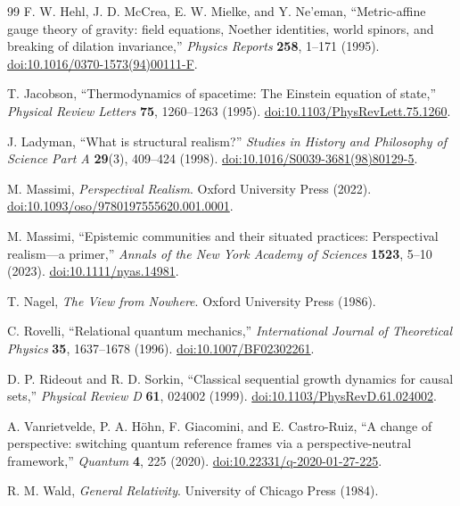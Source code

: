 \documentclass[11pt]{article}
\theoremstyle{definition}
\theoremstyle{remark}
\begin{document}
\begin{thebibliography}{99}
F. W. Hehl, J. D. McCrea, E. W. Mielke, and Y. Ne'eman, ``Metric-affine gauge theory of gravity: field equations, Noether identities, world spinors, and breaking of dilation invariance,'' \emph{Physics Reports} \textbf{258}, 1--171 (1995). \href{https://doi.org/10.1016/0370-1573(94)00111-F}{doi:10.1016/0370-1573(94)00111-F}.

T. Jacobson, ``Thermodynamics of spacetime: The Einstein equation of state,'' \emph{Physical Review Letters} \textbf{75}, 1260--1263 (1995). \href{https://doi.org/10.1103/PhysRevLett.75.1260}{doi:10.1103/PhysRevLett.75.1260}.

J. Ladyman, ``What is structural realism?'' \emph{Studies in History and Philosophy of Science Part A} \textbf{29}(3), 409--424 (1998). \href{https://doi.org/10.1016/S0039-3681(98)80129-5}{doi:10.1016/S0039-3681(98)80129-5}.

M. Massimi, \emph{Perspectival Realism}. Oxford University Press (2022). \href{https://doi.org/10.1093/oso/9780197555620.001.0001}{doi:10.1093/oso/9780197555620.001.0001}.

M. Massimi, ``Epistemic communities and their situated practices: Perspectival realism---a primer,'' \emph{Annals of the New York Academy of Sciences} \textbf{1523}, 5--10 (2023). \href{https://doi.org/10.1111/nyas.14981}{doi:10.1111/nyas.14981}.

T. Nagel, \emph{The View from Nowhere}. Oxford University Press (1986).

C. Rovelli, ``Relational quantum mechanics,'' \emph{International Journal of Theoretical Physics} \textbf{35}, 1637--1678 (1996). \href{https://doi.org/10.1007/BF02302261}{doi:10.1007/BF02302261}.

D. P. Rideout and R. D. Sorkin, ``Classical sequential growth dynamics for causal sets,'' \emph{Physical Review D} \textbf{61}, 024002 (1999). \href{https://doi.org/10.1103/PhysRevD.61.024002}{doi:10.1103/PhysRevD.61.024002}.

A. Vanrietvelde, P. A. H\"ohn, F. Giacomini, and E. Castro-Ruiz, ``A change of perspective: switching quantum reference frames via a perspective-neutral framework,'' \emph{Quantum} \textbf{4}, 225 (2020). \href{https://doi.org/10.22331/q-2020-01-27-225}{doi:10.22331/q-2020-01-27-225}.

R. M. Wald, \emph{General Relativity}. University of Chicago Press (1984).


\end{thebibliography}
\end{document}
